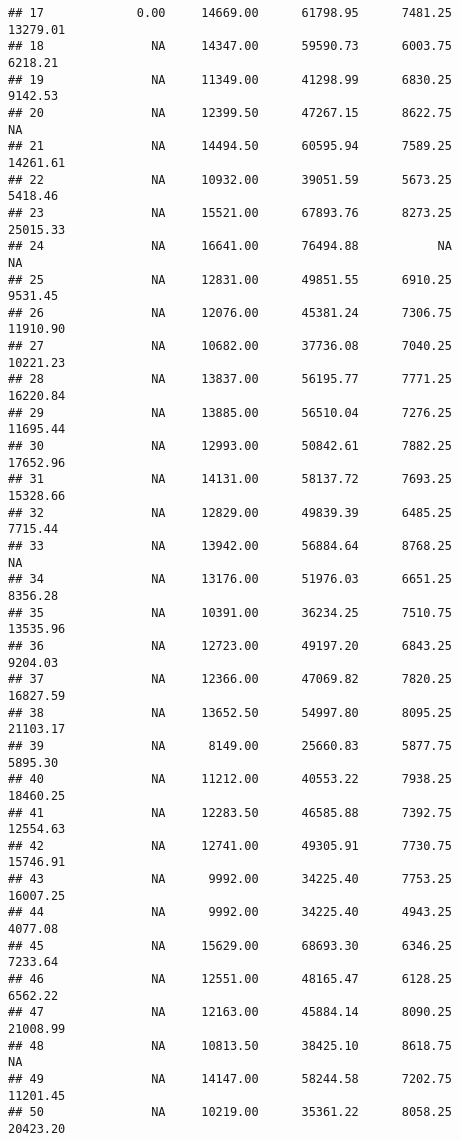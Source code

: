 \documentclass[]{article}
\begin{document}
\begin{verbatim}
## 17             0.00     14669.00      61798.95      7481.25      13279.01
## 18               NA     14347.00      59590.73      6003.75       6218.21
## 19               NA     11349.00      41298.99      6830.25       9142.53
## 20               NA     12399.50      47267.15      8622.75            NA
## 21               NA     14494.50      60595.94      7589.25      14261.61
## 22               NA     10932.00      39051.59      5673.25       5418.46
## 23               NA     15521.00      67893.76      8273.25      25015.33
## 24               NA     16641.00      76494.88           NA            NA
## 25               NA     12831.00      49851.55      6910.25       9531.45
## 26               NA     12076.00      45381.24      7306.75      11910.90
## 27               NA     10682.00      37736.08      7040.25      10221.23
## 28               NA     13837.00      56195.77      7771.25      16220.84
## 29               NA     13885.00      56510.04      7276.25      11695.44
## 30               NA     12993.00      50842.61      7882.25      17652.96
## 31               NA     14131.00      58137.72      7693.25      15328.66
## 32               NA     12829.00      49839.39      6485.25       7715.44
## 33               NA     13942.00      56884.64      8768.25            NA
## 34               NA     13176.00      51976.03      6651.25       8356.28
## 35               NA     10391.00      36234.25      7510.75      13535.96
## 36               NA     12723.00      49197.20      6843.25       9204.03
## 37               NA     12366.00      47069.82      7820.25      16827.59
## 38               NA     13652.50      54997.80      8095.25      21103.17
## 39               NA      8149.00      25660.83      5877.75       5895.30
## 40               NA     11212.00      40553.22      7938.25      18460.25
## 41               NA     12283.50      46585.88      7392.75      12554.63
## 42               NA     12741.00      49305.91      7730.75      15746.91
## 43               NA      9992.00      34225.40      7753.25      16007.25
## 44               NA      9992.00      34225.40      4943.25       4077.08
## 45               NA     15629.00      68693.30      6346.25       7233.64
## 46               NA     12551.00      48165.47      6128.25       6562.22
## 47               NA     12163.00      45884.14      8090.25      21008.99
## 48               NA     10813.50      38425.10      8618.75            NA
## 49               NA     14147.00      58244.58      7202.75      11201.45
## 50               NA     10219.00      35361.22      8058.25      20423.20

\end{verbatim}
\end{document}
